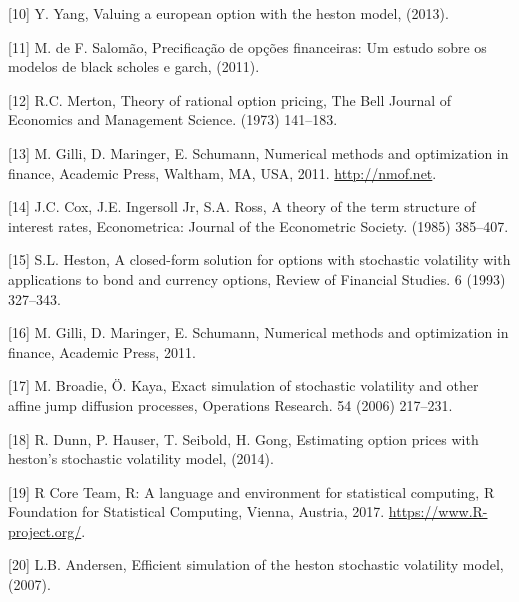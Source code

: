 \documentclass[12pt,twoside]{reedthesis}
\theoremstyle{definition}
\theoremstyle{definition}
\theoremstyle{remark}
\begin{document}
  \hypertarget{ref-yang2013valuing}{}
  {[}10{]} Y. Yang, Valuing a european option with the heston model,
  (2013).
  
  \hypertarget{ref-salomao2011precificaccao}{}
  {[}11{]} M. de F. Salomão, Precificação de opções financeiras: Um estudo
  sobre os modelos de black scholes e garch, (2011).
  
  \hypertarget{ref-merton1973theory}{}
  {[}12{]} R.C. Merton, Theory of rational option pricing, The Bell
  Journal of Economics and Management Science. (1973) 141--183.
  
  \hypertarget{ref-nmof}{}
  {[}13{]} M. Gilli, D. Maringer, E. Schumann, Numerical methods and
  optimization in finance, Academic Press, Waltham, MA, USA, 2011.
  \url{http://nmof.net}.
  
  \hypertarget{ref-cox1985theory}{}
  {[}14{]} J.C. Cox, J.E. Ingersoll Jr, S.A. Ross, A theory of the term
  structure of interest rates, Econometrica: Journal of the Econometric
  Society. (1985) 385--407.
  
  \hypertarget{ref-heston1993closed}{}
  {[}15{]} S.L. Heston, A closed-form solution for options with stochastic
  volatility with applications to bond and currency options, Review of
  Financial Studies. 6 (1993) 327--343.
  
  \hypertarget{ref-gilli_numerical_2011}{}
  {[}16{]} M. Gilli, D. Maringer, E. Schumann, Numerical methods and
  optimization in finance, Academic Press, 2011.
  
  \hypertarget{ref-broadie2006exact}{}
  {[}17{]} M. Broadie, Ö. Kaya, Exact simulation of stochastic volatility
  and other affine jump diffusion processes, Operations Research. 54
  (2006) 217--231.
  
  \hypertarget{ref-dunn2014estimating}{}
  {[}18{]} R. Dunn, P. Hauser, T. Seibold, H. Gong, Estimating option
  prices with heston's stochastic volatility model, (2014).
  
  \hypertarget{ref-rlang}{}
  {[}19{]} R Core Team, R: A language and environment for statistical
  computing, R Foundation for Statistical Computing, Vienna, Austria,
  2017. \url{https://www.R-project.org/}.
  
  \hypertarget{ref-andersen2007efficient}{}
  {[}20{]} L.B. Andersen, Efficient simulation of the heston stochastic
  volatility model, (2007).


\end{document}
